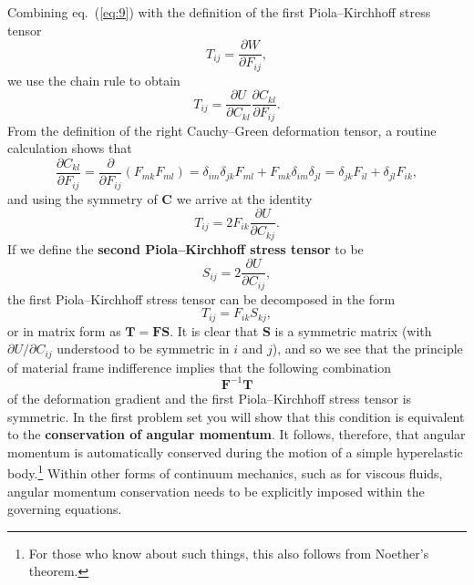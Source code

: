 Combining eq.~(\ref{eq:9}) with the definition of the first Piola--Kirchhoff stress tensor
\begin{equation}
T_{ij} = \frac{\partial W}{\partial F_{ij}},
\label{eq:10}
\end{equation}
we use the chain rule to obtain
\begin{equation}
T_{ij} = \frac{\partial U}{\partial C_{kl}}\frac{\partial C_{kl}}{\partial F_{ij}}.
\label{eq:11}
\end{equation}
From the definition of the right Cauchy--Green deformation tensor, a routine calculation shows that
\begin{equation}
\frac{\partial C_{kl}}{\partial F_{ij}} = \frac{\partial}{\partial F_{ij}}(F_{mk}F_{ml}) = \delta_{im}\delta_{jk}F_{ml} + F_{mk}\delta_{im}\delta_{jl} = \delta_{jk}F_{il} + \delta_{jl}F_{ik},
\label{eq:12}
\end{equation}
and using the symmetry of $\mathbf{C}$ we arrive at the identity
\begin{equation}
T_{ij} = 2F_{ik}\frac{\partial U}{\partial C_{kj}}.
\label{eq:13}
\end{equation}
If we define the \textbf{second Piola--Kirchhoff stress tensor} to be
\begin{equation}
S_{ij} = 2\frac{\partial U}{\partial C_{ij}},
\label{eq:14}
\end{equation}
the first Piola--Kirchhoff stress tensor can be decomposed in the form
\begin{equation}
T_{ij} = F_{ik}S_{kj},
\label{eq:15}
\end{equation}
or in matrix form as $\mathbf{T} = \mathbf{F}\mathbf{S}$. It is clear that $\mathbf{S}$ is a symmetric matrix (with $\partial U/\partial C_{ij}$ understood to be symmetric in $i$ and $j$),
 and so we see that the principle of material frame indifference implies that the following combination
\begin{equation}
\mathbf{F}^{-1}\mathbf{T}
\label{eq:16}
\end{equation}
of the deformation gradient and the first Piola--Kirchhoff stress tensor is symmetric. In the first 
problem set you will show that this condition is equivalent to the \textbf{conservation of angular momentum}. It follows, therefore, 
that angular momentum is automatically conserved during the motion of a simple hyperelastic body.\footnote{For those
 who know about such things, this also follows from Noether's theorem.} Within other forms of
 continuum mechanics, such as for viscous fluids, angular momentum conservation needs to be explicitly imposed within the governing equations.


